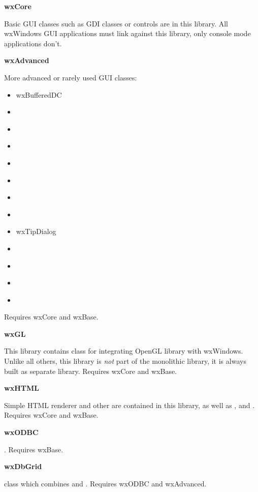 {\large {\bf wxCore}}

Basic GUI classes such as GDI classes or controls are in this library. All
wxWindows GUI applications must link against this library, only console mode
applications don't.

{\large {\bf wxAdvanced}}

More advanced or rarely used GUI classes:

\begin{itemize}\itemsep=0pt
\item{ wxBufferedDC }
\item{  }
\item{  }
\item{  }
\item{  }
\item{  }
\item{  }
\item{  }
\item{ wxTipDialog }
\item{  }
\item{  }
\item{  }
\item{  }
\end{itemize}

Requires wxCore and wxBase.

{\large {\bf wxGL}}

This library contains  class for integrating
OpenGL library with wxWindows. Unlike all others, this library is {\em not}
 part of the monolithic library, it is always built as separate library.
Requires wxCore and wxBase.

{\large {\bf wxHTML}}

Simple HTML renderer and other  are
contained in this library, as well as
 ,
  and
 . Requires wxCore and wxBase.

{\large {\bf wxODBC}}

. Requires wxBase.

{\large {\bf wxDbGrid}}

 class which combines 
  and . 
Requires wxODBC and wxAdvanced.

